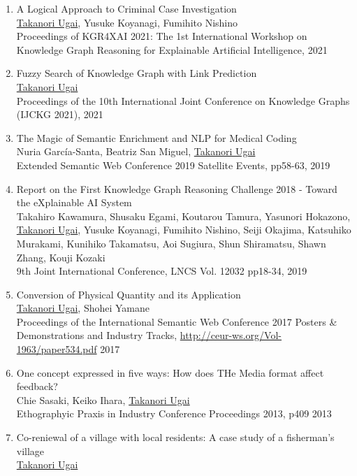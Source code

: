 \documentclass[dvipdfmx]{jlreq}
\begin{document}
\begin{enumerate}
\begin{enumerate}
\begin{enumerate}[label=\arabic*,align=right, labelsep=3pt]
Proceedings of the 11th International Joint Conference on Knowledge Graphs (IJCKG2022), pp. 64-72, 2022
\item A Logical Approach to Criminal Case Investigation\\
\underline{Takanori Ugai}, Yusuke Koyanagi, Fumihito Nishino\\
Proceedings of KGR4XAI 2021: The 1st International Workshop on Knowledge Graph Reasoning for Explainable Artificial Intelligence, 2021
\item Fuzzy Search of Knowledge Graph with Link Prediction\\
\underline{Takanori Ugai}\\
Proceedings of the 10th International Joint Conference on Knowledge Graphs (IJCKG 2021), 2021
\item The Magic of Semantic Enrichment and NLP for Medical Coding\\
Nuria García-Santa, Beatriz San Miguel, \underline{Takanori Ugai}\\
Extended Semantic Web Conference 2019 Satellite Events, pp58-63, 2019
\item Report on the First Knowledge Graph Reasoning Challenge 2018 - Toward the eXplainable AI System\\
Takahiro Kawamura, Shusaku Egami, Koutarou Tamura, Yasunori Hokazono, \underline{Takanori Ugai}, Yusuke Koyanagi, Fumihito Nishino, Seiji Okajima, Katsuhiko Murakami, Kunihiko Takamatsu, Aoi Sugiura, Shun Shiramatsu, Shawn Zhang, Kouji Kozaki\\
9th Joint International Conference, LNCS Vol. 12032 pp18-34, 2019
\item Conversion of Physical Quantity and its Application\\
\underline{Takanori Ugai}, Shohei Yamane\\
Proceedings of the International Semantic Web Conference 2017 Posters {\&} Demonstrations and Industry Tracks, \url{http://ceur-ws.org/Vol-1963/paper534.pdf} 2017
\item One concept expressed in five ways: How does THe Media format affect feedback?\\
Chie Sasaki, Keiko Ihara, \underline{Takanori Ugai}\\
Ethographyic Praxis in Industry Conference Proceedings 2013, p409 2013
\item Co-reniewal of a village with local residents: A case study of a fisherman's village\\
\underline{Takanori Ugai}\\

\end{enumerate}
\end{enumerate}
\end{enumerate}
\end{document}
